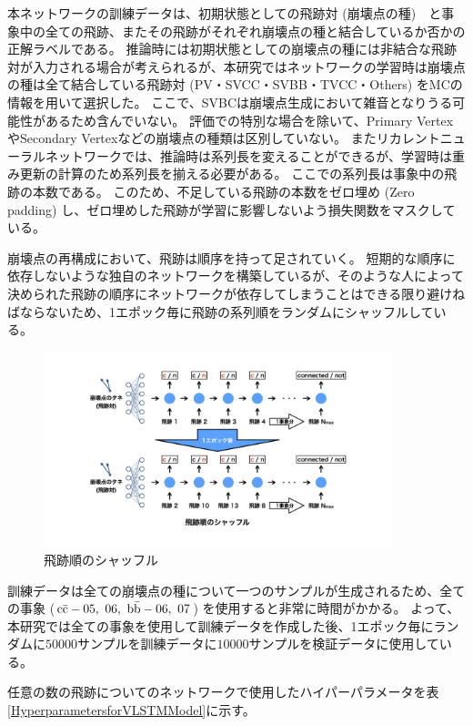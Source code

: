 本ネットワークの訓練データは、初期状態としての飛跡対 (崩壊点の種)　と事象中の全ての飛跡、またその飛跡がそれぞれ崩壊点の種と結合しているか否かの正解ラベルである。
推論時には初期状態としての崩壊点の種には非結合な飛跡対が入力される場合が考えられるが、本研究ではネットワークの学習時は崩壊点の種は全て結合している飛跡対 (PV・SVCC・SVBB・TVCC・Others) をMCの情報を用いて選択した。
ここで、SVBCは崩壊点生成において雑音となりうる可能性があるため含んでいない。
評価での特別な場合を除いて、Primary VertexやSecondary Vertexなどの崩壊点の種類は区別していない。
またリカレントニューラルネットワークでは、推論時は系列長を変えることができるが、学習時は重み更新の計算のため系列長を揃える必要がある。
ここでの系列長は事象中の飛跡の本数である。
このため、不足している飛跡の本数をゼロ埋め (Zero padding) し、ゼロ埋めした飛跡が学習に影響しないよう損失関数をマスクしている。

崩壊点の再構成において、飛跡は順序を持って足されていく。
短期的な順序に依存しないような独自のネットワークを構築しているが、そのような人によって決められた飛跡の順序にネットワークが依存してしまうことはできる限り避けねばならないため、1エポック毎に飛跡の系列順をランダムにシャッフルしている。

\begin{figure}[htbp]
 \centering
 \includegraphics[trim = 150 50 150 0, width=0.9\textwidth, clip]{Figure/3Networks/3-4-3-1TrackShuffle.png}
 \caption{飛跡順のシャッフル}
 \label{3-4-3-1TrackShuffle}
\end{figure}

訓練データは全ての崩壊点の種について一つのサンプルが生成されるため、全ての事象 ($\rm c\bar{c}-05,\ 06,\ \rm b\bar{b}-06,\ 07$) を使用すると非常に時間がかかる。
よって、本研究では全ての事象を使用して訓練データを作成した後、1エポック毎にランダムに$50000$サンプルを訓練データに$10000$サンプルを検証データに使用している。


任意の数の飛跡についてのネットワークで使用したハイパーパラメータを表\ref{HyperparametersforVLSTMModel}に示す。

